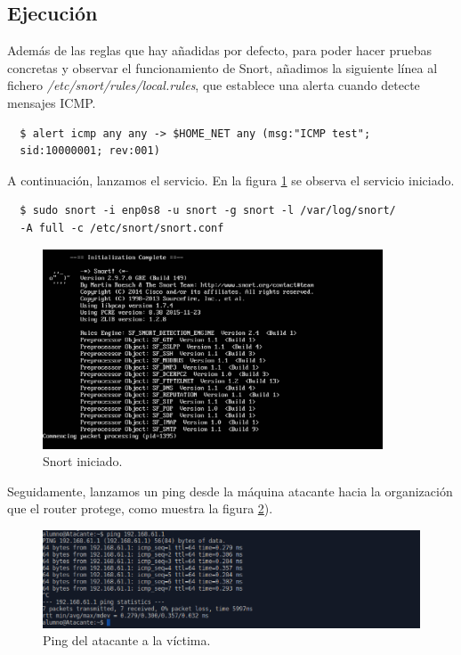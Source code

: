 \documentclass[a4,12pt,onecolum]{article}
\begin{document}
\subsection{Ejecución}

Además de las reglas que hay añadidas por defecto, para poder hacer pruebas concretas y observar el funcionamiento de Snort, añadimos la siguiente línea al fichero \emph{/etc/snort/rules/local.rules}, que establece una alerta cuando detecte mensajes ICMP.

\begin{verbatim}
  $ alert icmp any any -> $HOME_NET any (msg:"ICMP test";
  sid:10000001; rev:001)
\end{verbatim}

A continuación, lanzamos el servicio. En la figura \ref{fig:snort2} se observa el servicio iniciado.

\begin{verbatim}
  $ sudo snort -i enp0s8 -u snort -g snort -l /var/log/snort/
  -A full -c /etc/snort/snort.conf
\end{verbatim}

\begin{figure}[H]
\centering
\includegraphics[width=0.9\textwidth]{./images/SnortInicio.png}
\caption{Snort iniciado.}
\label{fig:snort2}
\end{figure}

Seguidamente, lanzamos un ping desde la máquina atacante hacia la organización que el router protege, como muestra la figura \ref{fig:snort3}).

\begin{figure}[H]
\centering
\includegraphics[width=1.0\textwidth]{./images/SnortPing.png}
\caption{Ping del atacante a la víctima.}
\label{fig:snort3}
\end{figure}
\end{document}

